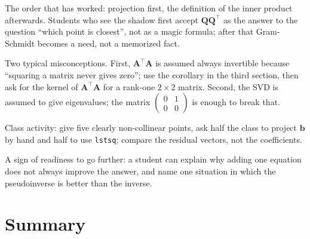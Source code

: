 \begin{untukdosen}
The order that has worked: projection first, the definition of the inner product afterwards.
Students who see the shadow first accept $\mathbf{Q}\mathbf{Q}^{\top}$ as the
answer to the question ``which point is closest'', not as a magic formula; after that
Gram-Schmidt becomes a need, not a memorized fact.

Two typical misconceptions. First, $\mathbf{A}^{\top}\mathbf{A}$ is assumed always invertible
because ``squaring a matrix never gives zero''; use the corollary in the third section, then ask for the
kernel of $\mathbf{A}^{\top}\mathbf{A}$ for a rank-one $2\times2$ matrix. Second, the SVD
is assumed to give eigenvalues; the matrix $\begin{pmatrix}0&1\\0&0\end{pmatrix}$ is enough to
break that.

Class activity: give five clearly non-collinear points, ask half the class
to project $\mathbf{b}$ by hand and half to use \texttt{lstsq}; compare the
residual vectors, not the coefficients.

A sign of readiness to go further: a student can explain why adding one equation does not
always improve the answer, and name one situation in which the pseudoinverse is better
than the inverse.
\end{untukdosen}

\section{Summary}

